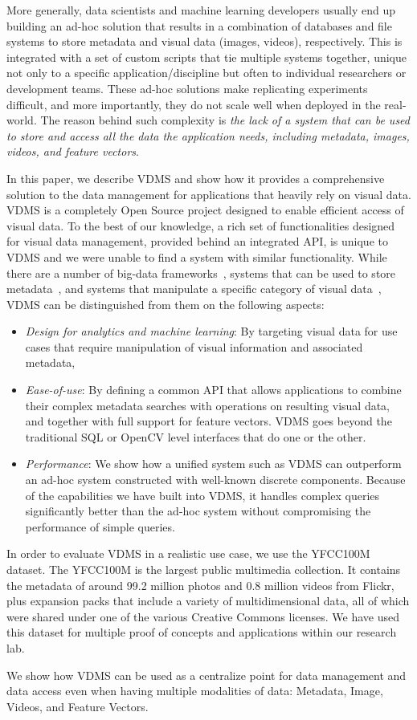 More generally, data scientists and machine learning developers 
usually end up building an ad-hoc solution that results in a 
combination of databases and file systems to store 
metadata and visual data (images, videos), respectively. 
This is integrated with a set of custom scripts that tie multiple systems together, 
unique not only to a specific application/discipline but often 
to individual researchers or development teams.
These ad-hoc solutions make replicating experiments difficult, 
and more importantly, they do not scale well when deployed in the real-world.
The reason behind such complexity is \textit{the lack of a system 
that can be used to store and access all the data the application needs, 
including metadata, images, videos, and feature vectors}.

In this paper, we describe VDMS and show how it provides a 
comprehensive solution to the data management for applications 
that heavily rely on visual data. 
VDMS is a completely Open Source project designed to enable 
efficient access of visual data.
To the best of our knowledge, a rich set of functionalities 
designed for visual data management, provided behind an integrated API, 
is unique to VDMS and we were unable to find a system with similar functionality.
While there are a number of big-data frameworks~\cite{spark, hadoop}, systems
that can be used to store metadata~\cite{memsql, vertica}, and systems that
manipulate a specific category of visual data~\cite{scidb, rasdaman}, VDMS can
be distinguished from them on the following aspects:

\begin{itemize}
\item {\em Design for analytics and machine learning}: By targeting
visual data for use cases that require manipulation
of visual information and associated metadata,
\item {\em Ease-of-use}: By defining a common API that allows applications to
combine their complex metadata searches with operations on resulting visual
data, and together with full support for feature vectors. VDMS goes beyond the
traditional SQL or OpenCV level interfaces that do one or the other.
\item {\em Performance}: We show how a unified system such as VDMS can
outperform an ad-hoc system constructed with well-known discrete components.
Because of the capabilities we have built into VDMS, it handles complex
queries significantly better than the ad-hoc system without compromising the
performance of simple queries.
\end{itemize}

In order to evaluate VDMS in a realistic use case, 
we use the YFCC100M dataset\cite{Thomee_2016}. 
The YFCC100M is the largest public multimedia collection. 
It contains the metadata of around 99.2 million photos 
and 0.8 million videos from Flickr,
plus expansion packs that include a variety of multidimensional data,
all of which were shared under one of the various Creative Commons licenses.
We have used this dataset
for multiple proof of concepts and applications within our research lab. 

We show how VDMS can be used as a centralize point for data
management and data access even when having multiple modalities of data:
Metadata, Image, Videos, and Feature Vectors.
